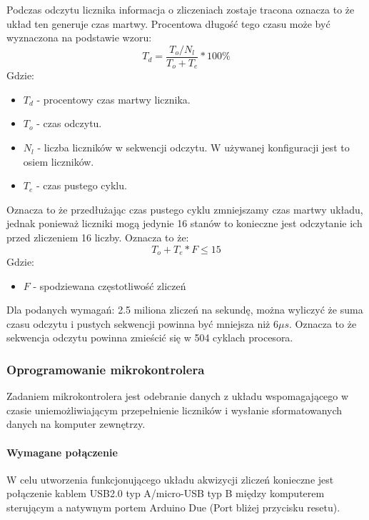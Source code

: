 Podczas odczytu licznika informacja o zliczeniach zostaje tracona oznacza to że układ ten generuje czas martwy. 
Procentowa długość tego czasu może być wyznaczona na podstawie wzoru:
\begin{equation}
        T_d = \frac{T_o/N_l}{T_o+T_e} * 100\%
\end{equation}
Gdzie:
\begin{itemize}
        \item $T_d$ - procentowy czas martwy licznika.
        \item $T_o$ - czas odczytu.
        \item $N_l$ - liczba liczników w sekwencji odczytu. W używanej konfiguracji jest to osiem liczników. 
        \item $T_e$ - czas pustego cyklu.
\end{itemize}

Oznacza to że przedłużając czas pustego cyklu zmniejszamy czas martwy układu, jednak ponieważ liczniki mogą jedynie 16 stanów to konieczne jest odczytanie ich przed zliczeniem 16 liczby. 
Oznacza to że:
\begin{equation}
        T_o+T_e * F \leqslant 15
\end{equation}
        Gdzie:
\begin{itemize}
        \item $F$ - spodziewana częstotliwość zliczeń
\end{itemize}

Dla podanych wymagań: 2.5 miliona zliczeń na sekundę, można wyliczyć że suma czasu odczytu i pustych sekwencji powinna być mniejsza niż 6$\mu s$.
Oznacza to że sekwencja odczytu powinna zmieścić się w 504 cyklach procesora. 

\subsubsection{Oprogramowanie mikrokontrolera}

Zadaniem mikrokontrolera jest odebranie danych z układu wspomagającego w czasie uniemożliwiającym przepełnienie liczników i wysłanie sformatowanych danych na komputer zewnętrzy. 

\paragraph{Wymagane połączenie}
W celu utworzenia funkcjonującego układu akwizycji zliczeń konieczne jest połączenie kablem USB2.0 typ A/micro-USB typ B między komputerem sterującym a natywnym portem Arduino Due (Port bliżej przycisku resetu).

